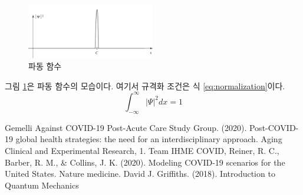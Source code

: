 \documentclass{article}
\begin{document}
	\begin{figure}[h]
		\centering
		\includegraphics[width=0.5\textwidth]{wave_function.png}
		\caption{파동 함수}
		\label{fig:wave_function}
	\end{figure}
	그림 \ref{fig:wave_function}은 파동 함수의 모습이다. 여기서 규격화 조건은 식 \eqref{eq:normalization}이다\cite{griffiths2018}.
	\begin{equation}
		\int_{-\infty}^{\infty} |\Psi|^2 dx = 1
		\label{eq:normalization}
	\end{equation}
	
	
\begin{thebibliography}{99}
	 Gemelli Against COVID-19 Post-Acute Care Study Group. (2020). Post-COVID-19 global health strategies: the need for an interdisciplinary approach. Aging Clinical and Experimental Research, 1.
	 Team IHME COVID, Reiner, R. C., Barber, R. M., \& Collins, J. K. (2020). Modeling COVID-19 scenarios for the United States. Nature medicine.
	 David J. Griffiths. (2018). Introduction to Quantum Mechanics
\end{thebibliography}
\end{document}
